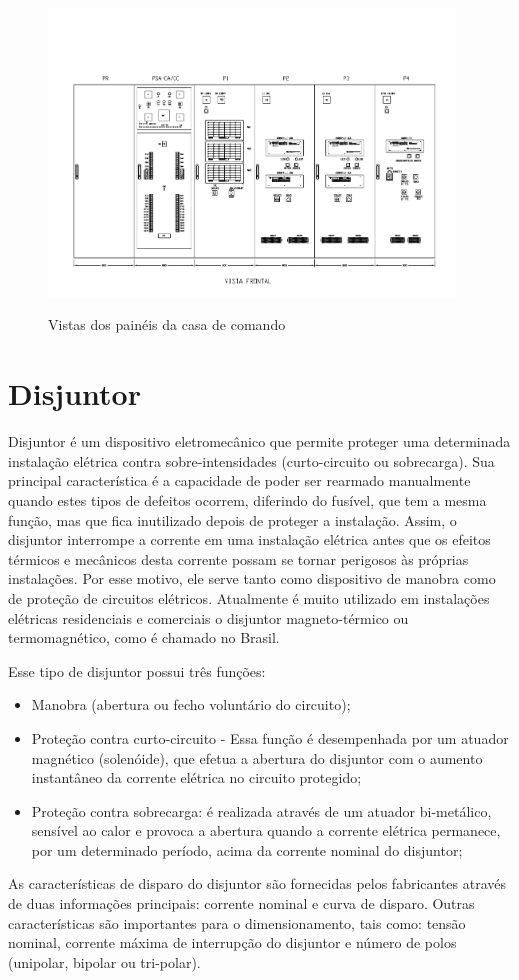 \documentclass[a5paper,english,spanish,brazil]{ufsc-thesis}
\begin{document}
		\begin{figure}[htb]
		  \caption{Vistas dos painéis da casa de comando}
		  \centering
		  \includegraphics[width=10.8cm]{paineis.pdf}
		  \label{fig:paineis}
		\end{figure}

	\section{Disjuntor}
		Disjuntor é um dispositivo eletromecânico que permite proteger uma determinada instalação elétrica contra sobre-intensidades (curto-circuito ou sobrecarga). Sua principal característica é a capacidade de poder ser rearmado manualmente quando estes tipos de defeitos ocorrem, diferindo do fusível, que tem a mesma função, mas que fica inutilizado depois de proteger a instalação. Assim, o disjuntor interrompe a corrente em uma instalação elétrica antes que os efeitos térmicos e mecânicos desta corrente possam se tornar perigosos às próprias instalações. Por esse motivo, ele serve tanto como dispositivo de manobra como de proteção de circuitos elétricos. Atualmente é muito utilizado em instalações elétricas residenciais e comerciais o disjuntor magneto-térmico ou termomagnético, como é chamado no Brasil.\par
		Esse tipo de disjuntor possui três funções:
		\begin{itemize}
		\item Manobra (abertura ou fecho voluntário do circuito);
		\item Proteção contra curto-circuito - Essa função é desempenhada por um atuador magnético (solenóide), que efetua a abertura do disjuntor com o aumento instantâneo da corrente elétrica no circuito protegido;
		\item Proteção contra sobrecarga: é realizada através de um atuador bi-metálico, sensível ao calor e provoca a abertura quando a corrente elétrica permanece, por um determinado período, acima da corrente nominal do disjuntor; 
		\end{itemize}\par
		As características de disparo do disjuntor são fornecidas pelos fabricantes através de duas informações principais: corrente nominal e curva de disparo. Outras características são importantes para o dimensionamento, tais como: tensão nominal, corrente máxima de interrupção do disjuntor e número de polos (unipolar, bipolar ou tri-polar).\par
\end{document}

